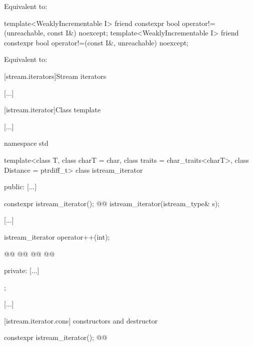 \begin{addedblock}
\begin{itemdescr}
\pnum
\effects Equivalent to: 
\end{itemdescr}

%
%
\begin{itemdecl}
template<WeaklyIncrementable I>
  friend constexpr bool operator!=(unreachable, const I&) noexcept;
template<WeaklyIncrementable I>
  friend constexpr bool operator!=(const I&, unreachable) noexcept;
\end{itemdecl}

\begin{itemdescr}
\pnum
\effects Equivalent to: 
\end{itemdescr}
\end{addedblock}


[stream.iterators]{Stream iterators}

[...]

[istream.iterator]{Class template }

[...]

\begin{codeblock}
namespace std {
  template<class T, class charT = char, class traits = char_traits<charT>,
           class Distance = ptrdiff_t>
  class istream_iterator {
  public:
    [...]

    constexpr istream_iterator();
    @@
    istream_iterator(istream_type& s);

    [...]

    istream_iterator  operator++(int);

    @@
    @@
    @@
    @@

  private:
    [...]
  };

  [...]
}
\end{codeblock}

[istream.iterator.cons]{ constructors and destructor}

%
\begin{itemdecl}
constexpr istream_iterator();
@@
\end{itemdecl}

